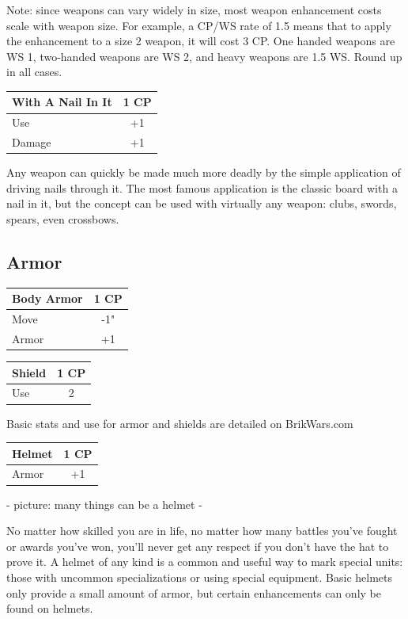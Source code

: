\documentclass[12pt,a4paper,twocolumn]{article}
\begin{document}
Note: since weapons can vary widely in size, most weapon enhancement costs scale with weapon size.  For example, a CP/WS rate of 1.5 means that to apply the enhancement to a size 2 weapon, it will cost 3 CP.  One handed weapons are WS 1, two-handed weapons are WS 2, and heavy weapons are 1.5 WS.  Round up in all cases.

\begin{tabular}{|l|c|} \hline
With A Nail In It & 1 CP \\ \hline
Use & +1 \\ \hline
Damage & +1 \\ \hline
\end{tabular}

Any weapon can quickly be made much more deadly by the simple application of driving nails through it.  The most famous application is the classic board with a nail in it, but the concept can be used with virtually any weapon: clubs, swords, spears, even crossbows.

\subsection{Armor}

\begin{tabular}{|l|c|} \hline
Body Armor & 1 CP \\ \hline
Move & -1" \\ \hline
Armor & +1 \\ \hline
\end{tabular}

\begin{tabular}{|l|c|} \hline
Shield & 1 CP \\ \hline
Use & 2 \\ \hline
\end{tabular}

Basic stats and use for armor and shields are detailed on BrikWars.com

\begin{tabular}{|l|c|} \hline
Helmet & 1 CP \\ \hline
Armor & +1 \\ \hline
\end{tabular}

- picture: many things can be a helmet -

No matter how skilled you are in life, no matter how many battles you've fought or awards you've won, you'll never get any respect if you don't have the hat to  prove it.  A helmet of any kind is a common and useful way to mark special units: those with uncommon specializations or using special equipment.  Basic helmets only provide a small amount of armor, but certain enhancements can only be found on helmets.
\end{document}
